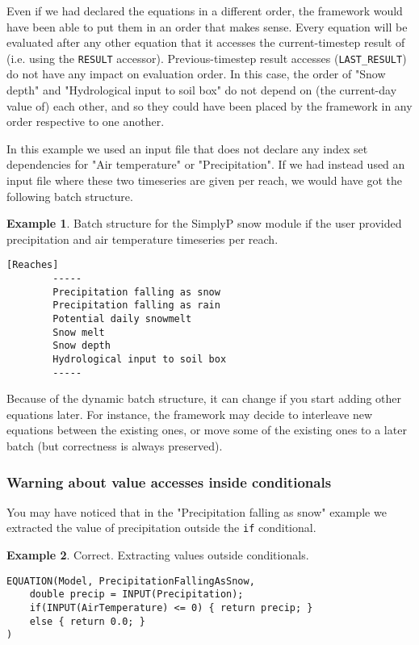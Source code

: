 \documentclass[11pt]{article}
\theoremstyle{definition}
\newtheorem{myexample}{Example}
\newenvironment{example}%
  {\begin{lrbox}{\examplebox}%
   \begin{minipage}{\dimexpr\linewidth-2\fboxsep}
   \begin{myexample}}%
  {\end{myexample}%
   \end{minipage}%
   \end{lrbox}%
   \begin{trivlist}
     \item[]\colorbox{silver}{\usebox\examplebox}
   \end{trivlist}}
\begin{document}
Even if we had declared the equations in a different order, the framework would have been able to put them in an order that makes sense. Every equation will be evaluated after any other equation that it accesses the current-timestep result of (i.e. using the {\tt RESULT} accessor). Previous-timestep result accesses ({\tt LAST\_RESULT}) do not have any impact on evaluation order. In this case, the order of "Snow depth" and "Hydrological input to soil box" do not depend on (the current-day value of) each other, and so they could have been placed by the framework in any order respective to one another.

In this example we used an input file that does not declare any index set dependencies for "Air temperature" or "Precipitation". If we had instead used an input file where these two timeseries are given per reach, we would have got the following batch structure.

\begin{example}
Batch structure for the SimplyP snow module if the user provided precipitation and air temperature timeseries per reach.
\begin{lstlisting}[style=textstyle]
[Reaches]
        -----
        Precipitation falling as snow
        Precipitation falling as rain
        Potential daily snowmelt
        Snow melt
        Snow depth
        Hydrological input to soil box
        -----
\end{lstlisting}
\end{example}

Because of the dynamic batch structure, it can change if you start adding other equations later. For instance, the framework may decide to interleave new equations between the existing ones, or move some of the existing ones to a later batch (but correctness is always preserved).

\subsubsection{Warning about value accesses inside conditionals}

You may have noticed that in the "Precipitation falling as snow" example we extracted the value of precipitation outside the {\tt if} conditional.

\begin{example}\label{ex:simplypequations}
Correct. Extracting values outside conditionals.
\begin{lstlisting}[style=mycpp]
EQUATION(Model, PrecipitationFallingAsSnow,
	double precip = INPUT(Precipitation);
	if(INPUT(AirTemperature) <= 0) { return precip; }
	else { return 0.0; }
)
\end{lstlisting}
\end{example}
\end{document}
